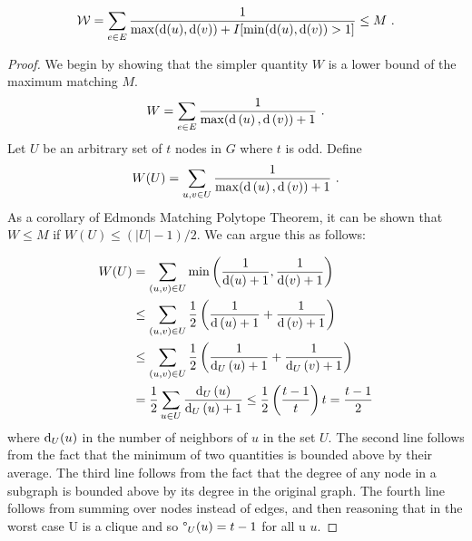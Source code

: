 

\begin{theorem}
\[
\W=\sum_{e\in E} \frac{1}{\max(\ndegree(u), \ndegree(v))+I[\min(\ndegree(u),\ndegree(v))>1]}\leq M \ .
\]
\end{theorem}

\begin{proof}
We begin by showing that the simpler quantity $W$ is a lower bound of the maximum matching $M$.
\[
W = \sum_{e\in E} \frac{1}{\max(\textup{d}\left( u\right), \textup{d}\left( v\right) )+1}\ .
\]
Let $U$ be an arbitrary set of $t$ nodes in $G$ where $t$ is odd.   Define $$W(U) = \sum_{u,v \in U} \frac{1}{\max(\ndegree\lp u\rparen, \ndegree\lp v\rparen )+1} \ . $$ As a corollary of Edmonds Matching Polytope Theorem, it can be shown that $W \leq M$ if  $W(U) \leq (|U|-1)/2$. We can argue this as follows:

\begin{align*}
W(U) &= \sum_{(u,v) \in U} \min \left(\frac{1}{\textup{d}(u)+1},\frac{1}{\textup{d}(v)+1}\right )\\
& \leq \sum_{(u,v) \in U}\frac{1}{2}\left( \frac{1}{\textup{d}\left( u \right) +1}+\frac{1}{\textup{d}\left( v\right) +1}\right)\\
&\leq \sum_{(u,v) \in U}\frac{1}{2}\left( \frac{1}{\textup{d}_U\left( u\right) +1}+\frac{1}{\textup{d}_U\left( v\right) +1}\right)\\
&= \frac{1}{2} \sum_{u \in U} \frac{\textup{d}_U\left( u\right) }{\textup{d}_U\left( u\right) +1} \leq  \frac{1}{2} \left( \frac{t-1}{t}\right)  t = \frac{t-1}{2}
\end{align*}
where $\textup{d}_U(u)$ in the number of neighbors of $u$ in the set $U$.
The second line follows from the fact that the minimum of two quantities is bounded above by their average.  The third line follows from the fact that the degree of any node in a subgraph is bounded above by its degree in the original graph.  The fourth line follows from summing over nodes instead of edges, and then reasoning that in the worst case U is a clique and so $\degree_U(u) = t-1$ for all u $u$.


\end{proof}
